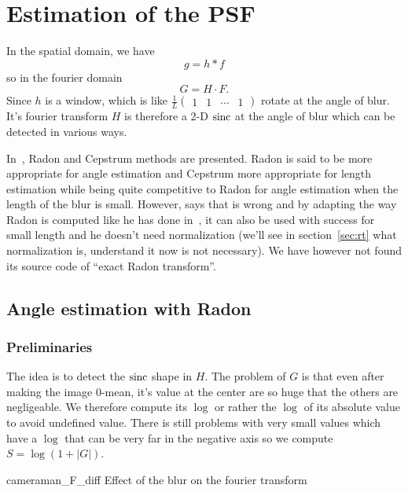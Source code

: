 \section{Estimation of the PSF}
In the spatial domain, we have
\[ g = h * f \]
so in the fourier domain
\[ G = H \cdot F. \]
Since $h$ is a window, which is like
$\frac{1}{L}
\begin{pmatrix}
  1 & 1 & \cdots & 1
\end{pmatrix}$ rotate at the angle of blur.
It's fourier transform $H$ is therefore
a 2-D $\operatorname{sinc}$ at the angle of blur
which can be detected in various ways.

In~\cite{krahmer2006blind},
Radon and Cepstrum methods are presented.
Radon is said to be more appropriate for angle
estimation and Cepstrum more appropriate for length
estimation while being quite competitive to Radon
for angle estimation when the length of the blur
is small.
However, \cite{oliveira2007blind} says that
\cite{krahmer2006blind} is wrong and by adapting
the way Radon is computed like he has done
in~\cite{oliveira2006implementation},
it can also be used with success for small length and
he doesn't need normalization
(we'll see in section~\ref{sec:rt} what
normalization is,
understand it now is not necessary).
We have however not found its source code of
``exact Radon transform''.

\subsection{Angle estimation with Radon}
\label{subsec:Radon}
\subsubsection{Preliminaries}
The idea is to detect the $\operatorname{sinc}$ shape in $H$.
The problem of $G$ is that even
after making the image 0-mean,
it's value at the center are so huge that the others
are negligeable.
We therefore compute its $\log$ or rather the $\log$
of its absolute value to avoid undefined value.
There is still problems with very small values which
have a $\log$ that can be very far in the negative axis
so we compute $S = \log(1 + |G|)$.

\begin{myfig}{cameraman_F_diff}
  {Effect of the blur on the fourier transform}
\end{myfig}

